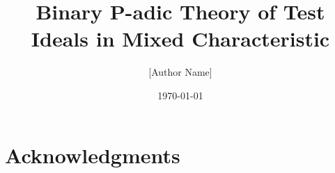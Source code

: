 \documentclass[12pt]{article}
\begin{document}
\title{Binary P-adic Theory of Test Ideals in Mixed Characteristic}
\author{[Author Name]}
\date{\today}
\maketitle

\begin{abstract}

\end{abstract}











\section*{Acknowledgments}




\end{document}
